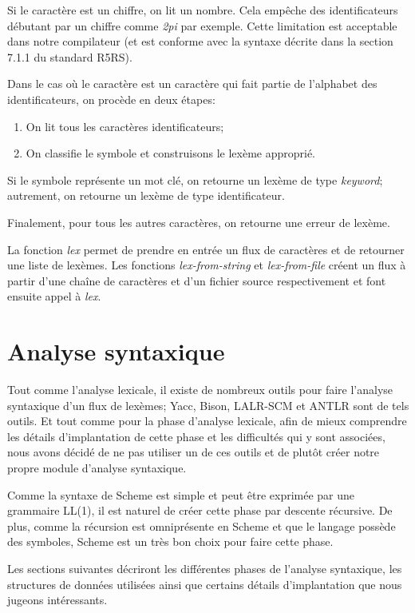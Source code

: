 \documentclass[11pt]{report}
\begin{document}
Si le caractère est un chiffre, on lit un nombre.  Cela empêche des
identificateurs débutant par un chiffre comme \emph{2pi} par exemple.
Cette limitation est acceptable dans notre compilateur (et est
conforme avec la syntaxe décrite dans la section 7.1.1 du standard
R5RS).

Dans le cas où le caractère est un caractère qui fait partie de
l'alphabet des identificateurs, on procède en deux étapes:

\begin{enumerate}
\item On lit tous les caractères identificateurs;
\item On classifie le symbole et construisons le lexème approprié.
\end{enumerate}

Si le symbole représente un mot clé, on retourne un lexème de type
\emph{keyword}; autrement, on retourne un lexème de type
identificateur.

Finalement, pour tous les autres caractères, on retourne une erreur de
lexème.

La fonction \emph{lex} permet de prendre en entrée un flux de
caractères et de retourner une liste de lexèmes.  Les fonctions
\emph{lex-from-string} et \emph{lex-from-file} créent un flux à partir
d'une chaîne de caractères et d'un fichier source respectivement et
font ensuite appel à \emph{lex}.


\chapter{Analyse syntaxique}

Tout comme l'analyse lexicale, il existe de nombreux outils pour faire
l'analyse syntaxique d'un flux de lexèmes; Yacc, Bison, LALR-SCM et
ANTLR sont de tels outils.  Et tout comme pour la phase d'analyse
lexicale, afin de mieux comprendre les détails d'implantation de cette
phase et les difficultés qui y sont associées, nous avons décidé de ne
pas utiliser un de ces outils et de plutôt créer notre propre module
d'analyse syntaxique.

Comme la syntaxe de Scheme est simple et peut être exprimée par une
grammaire LL(1), il est naturel de créer cette phase par descente
récursive.  De plus, comme la récursion est omniprésente en Scheme et
que le langage possède des symboles, Scheme est un très bon choix pour
faire cette phase.

Les sections suivantes décriront les différentes phases de l'analyse
syntaxique, les structures de données utilisées ainsi que certains
détails d'implantation que nous jugeons intéressants.
\end{document}
